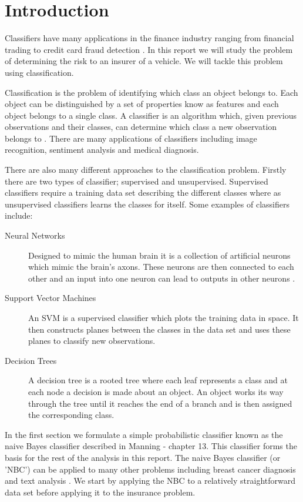 \chapter{Introduction}

Classifiers have many applications in the finance industry ranging from financial trading \cite{Gerlein16} to credit card fraud detection \cite{Pozzolo15}.
In this report we will study the problem of determining the risk to an insurer of a vehicle.
We will tackle this problem using classification.

Classification is the problem of identifying which class an object belongs to.
Each object can be distinguished by a set of properties know as features and each object belongs to a single class.
A classifier is an algorithm which, given previous observations and their classes, can determine which class a new observation belongs to \cite{Theodoridis03}.
There are many applications of classifiers including image recognition, sentiment analysis and medical diagnosis.

There are also many different approaches to the classification problem.
Firstly there are two types of classifier; supervised and unsupervised.
Supervised classifiers require a training data set describing the different classes where as unsupervised classifiers learns the classes for itself.
Some examples of classifiers include:
\begin{description}
	\item[Neural Networks] Designed to mimic the human brain it is a collection of artificial neurons which mimic the brain's axons. These neurons are then connected to each other and an input into one neuron can lead to outputs in other neurons \cite{Michie94}.
	\item[Support Vector Machines] An SVM is a supervised classifier which plots the training data in space. It then constructs planes between the classes in the data set and uses these planes to classify new observations.
	\item[Decision Trees] A decision tree is a rooted tree where each leaf represents a class and at each node a decision is made about an object. An object works its way through the tree until it reaches the end of a branch and is then assigned the corresponding class. 
\end{description}

In the first section we formulate a simple probabilistic classifier known as the naive Bayes classifier described in Manning \cite{Manning08} - chapter 13.
This classifier forms the basis for the rest of the analysis in this report.
The naive Bayes classifier (or 'NBC') can be applied to many other problems including breast cancer diagnosis \cite{Dumitru09} and text analysis \cite{Nigam98}.
We start by applying the NBC to a relatively straightforward data set before applying it to the insurance problem.

